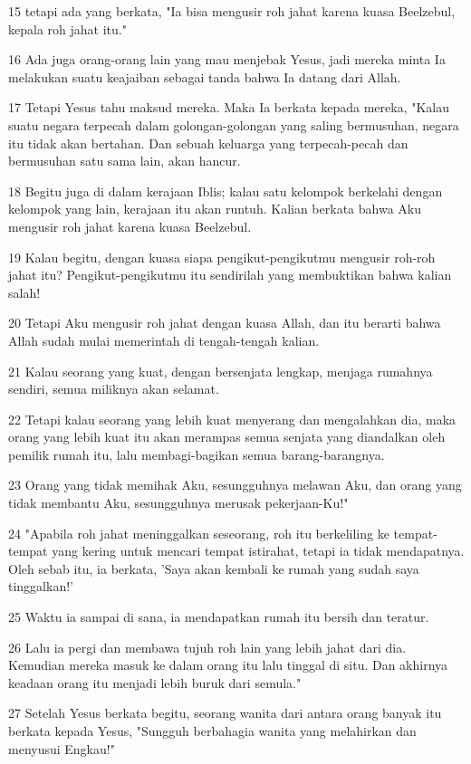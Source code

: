 \par 15 tetapi ada yang berkata, "Ia bisa mengusir roh jahat karena kuasa Beelzebul, kepala roh jahat itu."
\par 16 Ada juga orang-orang lain yang mau menjebak Yesus, jadi mereka minta Ia melakukan suatu keajaiban sebagai tanda bahwa Ia datang dari Allah.
\par 17 Tetapi Yesus tahu maksud mereka. Maka Ia berkata kepada mereka, "Kalau suatu negara terpecah dalam golongan-golongan yang saling bermusuhan, negara itu tidak akan bertahan. Dan sebuah keluarga yang terpecah-pecah dan bermusuhan satu sama lain, akan hancur.
\par 18 Begitu juga di dalam kerajaan Iblis; kalau satu kelompok berkelahi dengan kelompok yang lain, kerajaan itu akan runtuh. Kalian berkata bahwa Aku mengusir roh jahat karena kuasa Beelzebul.
\par 19 Kalau begitu, dengan kuasa siapa pengikut-pengikutmu mengusir roh-roh jahat itu? Pengikut-pengikutmu itu sendirilah yang membuktikan bahwa kalian salah!
\par 20 Tetapi Aku mengusir roh jahat dengan kuasa Allah, dan itu berarti bahwa Allah sudah mulai memerintah di tengah-tengah kalian.
\par 21 Kalau seorang yang kuat, dengan bersenjata lengkap, menjaga rumahnya sendiri, semua miliknya akan selamat.
\par 22 Tetapi kalau seorang yang lebih kuat menyerang dan mengalahkan dia, maka orang yang lebih kuat itu akan merampas semua senjata yang diandalkan oleh pemilik rumah itu, lalu membagi-bagikan semua barang-barangnya.
\par 23 Orang yang tidak memihak Aku, sesungguhnya melawan Aku, dan orang yang tidak membantu Aku, sesungguhnya merusak pekerjaan-Ku!"
\par 24 "Apabila roh jahat meninggalkan seseorang, roh itu berkeliling ke tempat-tempat yang kering untuk mencari tempat istirahat, tetapi ia tidak mendapatnya. Oleh sebab itu, ia berkata, 'Saya akan kembali ke rumah yang sudah saya tinggalkan!'
\par 25 Waktu ia sampai di sana, ia mendapatkan rumah itu bersih dan teratur.
\par 26 Lalu ia pergi dan membawa tujuh roh lain yang lebih jahat dari dia. Kemudian mereka masuk ke dalam orang itu lalu tinggal di situ. Dan akhirnya keadaan orang itu menjadi lebih buruk dari semula."
\par 27 Setelah Yesus berkata begitu, seorang wanita dari antara orang banyak itu berkata kepada Yesus, "Sungguh berbahagia wanita yang melahirkan dan menyusui Engkau!"
